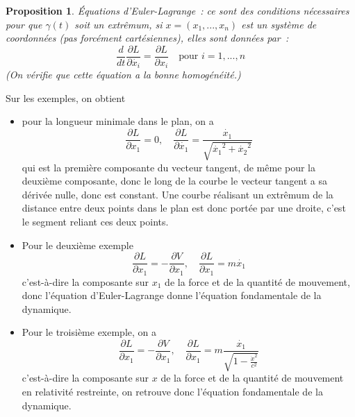 \documentclass[a4paper,11pt]{book}
\newtheorem{prop}[thm]{Proposition}
\begin{document}
\begin{giacjshere}
\begin{prop}
\'Equations d'Euler-Lagrange~: 
ce sont des conditions n\'ecessaires
pour que $\gamma(t)$ soit un extr\^emum, si
$x=(x_1,...,x_n)$ est un syst\`eme de coordonn\'ees (pas
forc\'ement cart\'esiennes),
elles sont donn\'ees par~:
$$ \frac{d}{dt} \frac{\partial L}{\partial \dot{x_i}} = 
\frac{\partial L}{\partial x_i} \quad \mbox{pour } i=1,...,n$$
(On v\'erifie que cette \'equation a la bonne homog\'en\'eit\'e.)
\end{prop}

Sur les exemples, on obtient
\begin{itemize}
\item pour la longueur minimale dans le plan, on a 
$$\frac{\partial L}{\partial x_1}=0, \quad
\frac{\partial L} {\partial \dot{x_1}}=\frac{\dot{x_1}} {\sqrt{\dot{x_1}^2+\dot{x_2}^2}}
$$
qui est la premi\`ere composante du vecteur tangent,
de m\^eme pour la deuxi\`eme composante, 
donc le long de la courbe le vecteur tangent a sa d\'eriv\'ee
nulle, donc est constant. Une
courbe r\'ealisant un extr\^emum de la distance entre deux points
dans le plan est donc port\'ee par une droite, c'est le segment
reliant ces deux points.
\item Pour le deuxi\`eme exemple
$$ \frac{\partial L}{\partial x_1}=-\frac{\partial V}{\partial x_1},
\quad \frac{\partial L}{\partial x_1}=m\dot{x_1}
$$
c'est-\`a-dire la composante sur $x_1$ de la force et
de la quantit\'e de mouvement, donc l'\'equation d'Euler-Lagrange
donne l'\'equation fondamentale de la dynamique.
\item
Pour le troisi\`eme exemple, on a
$$ \frac{\partial L}{\partial x_1}=-\frac{\partial V}{\partial x_1},
\quad \frac{\partial L}{\partial x_1}=m\frac{\dot{x_1}}{\sqrt{1- 
\frac{\dot{x}^2}{c^2}}}
$$
c'est-\`a-dire la composante sur $x$ de la force et
de la quantit\'e de mouvement en relativit\'e restreinte,
on retrouve donc l'\'equation fondamentale de la dynamique.
\end{itemize}


\end{giacjshere}
\end{document}
